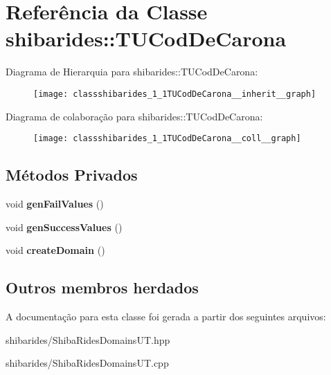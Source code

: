 \hypertarget{classshibarides_1_1TUCodDeCarona}{}\section{Referência da Classe shibarides\+:\+:T\+U\+Cod\+De\+Carona}
\label{classshibarides_1_1TUCodDeCarona}


Diagrama de Hierarquia para shibarides\+:\+:T\+U\+Cod\+De\+Carona\+:\nopagebreak
\begin{figure}[H]
\begin{center}
\leavevmode
\texttt{[image: classshibarides\_1\_1TUCodDeCarona\_\_inherit\_\_graph]}
\end{center}
\end{figure}


Diagrama de colaboração para shibarides\+:\+:T\+U\+Cod\+De\+Carona\+:\nopagebreak
\begin{figure}[H]
\begin{center}
\leavevmode
\texttt{[image: classshibarides\_1\_1TUCodDeCarona\_\_coll\_\_graph]}
\end{center}
\end{figure}
\subsection*{Métodos Privados}
\begin{DoxyCompactItemize}
\item 
void {\bfseries gen\+Fail\+Values} ()\hypertarget{classshibarides_1_1TUCodDeCarona_a79f5381ed62726241d2b47b70cc465c3}{}\label{classshibarides_1_1TUCodDeCarona_a79f5381ed62726241d2b47b70cc465c3}

\item 
void {\bfseries gen\+Success\+Values} ()\hypertarget{classshibarides_1_1TUCodDeCarona_a86436f9999337cf1de768d8908840400}{}\label{classshibarides_1_1TUCodDeCarona_a86436f9999337cf1de768d8908840400}

\item 
void {\bfseries create\+Domain} ()\hypertarget{classshibarides_1_1TUCodDeCarona_a3ebe5a9d63a8326a02aac176ce6f4d37}{}\label{classshibarides_1_1TUCodDeCarona_a3ebe5a9d63a8326a02aac176ce6f4d37}

\end{DoxyCompactItemize}
\subsection*{Outros membros herdados}


A documentação para esta classe foi gerada a partir dos seguintes arquivos\+:\begin{DoxyCompactItemize}
\item 
shibarides/Shiba\+Rides\+Domains\+U\+T.\+hpp\item 
shibarides/Shiba\+Rides\+Domains\+U\+T.\+cpp\end{DoxyCompactItemize}
